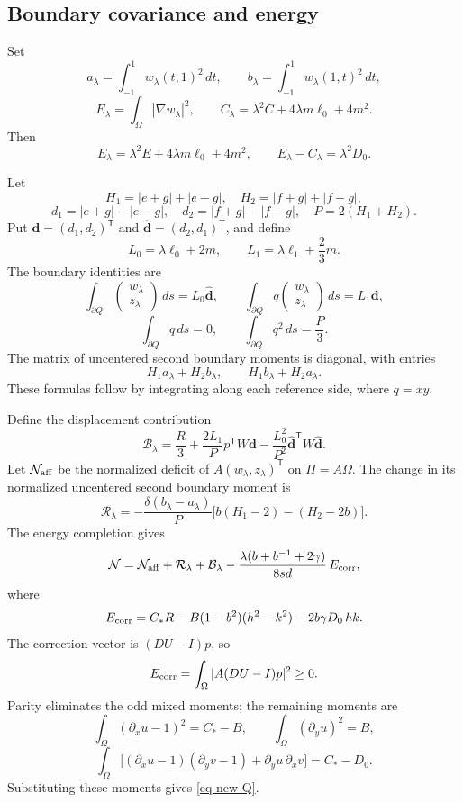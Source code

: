 \documentclass[11pt]{amsart}
\theoremstyle{remark}\newtheorem{remark}[theorem]{Remark}
\numberwithin{equation}{section}
\begin{document}
\subsection{Boundary covariance and energy}

Set
\[
a_\lambda=\int_{-1}^1w_\lambda(t,1)^2\,dt,\qquad
b_\lambda=\int_{-1}^1w_\lambda(1,t)^2\,dt,
\]
\[
E_\lambda=\int_\Omega|\nabla w_\lambda|^2,\qquad
C_\lambda=\lambda^2C+4\lambda m\ell_0+4m^2.
\]
Then
\[
E_\lambda=\lambda^2E+4\lambda m\ell_0+4m^2,\qquad
E_\lambda-C_\lambda=\lambda^2D_0.
\]

Let
\[
H_1=|e+g|+|e-g|,\quad H_2=|f+g|+|f-g|,
\]
\[
d_1=|e+g|-|e-g|,\quad d_2=|f+g|-|f-g|,
\quad P=2(H_1+H_2).
\]
Put \(\mathbf d=(d_1,d_2)^{\mathsf T}\) and
\(\widehat{\mathbf d}=(d_2,d_1)^{\mathsf T}\), and define
\[
L_0=\lambda\ell_0+2m,\qquad
L_1=\lambda\ell_1+\frac23m.
\]
The boundary identities are
\[
\int_{\partial Q}
\begin{pmatrix}w_\lambda\\z_\lambda\end{pmatrix}\,ds
=L_0\widehat{\mathbf d},\qquad
\int_{\partial Q}
q\begin{pmatrix}w_\lambda\\z_\lambda\end{pmatrix}\,ds
=L_1\mathbf d,
\]
\[
\int_{\partial Q}q\,ds=0,\qquad
\int_{\partial Q}q^2\,ds=\frac P3.
\]
The matrix of uncentered second boundary moments is diagonal, with entries
\[
H_1a_\lambda+H_2b_\lambda,\qquad
H_1b_\lambda+H_2a_\lambda.
\]
These formulas follow by integrating along each reference side,
where \(q=xy\).

Define the displacement contribution
\begin{equation}
\label{eq-new-boundary-functional}
\mathcal B_\lambda=
\frac R3+\frac{2L_1}{P}p^{\mathsf T}W\mathbf d
-\frac{L_0^2}{P^2}
\widehat{\mathbf d}^{\mathsf T}W\widehat{\mathbf d}.
\end{equation}
Let \(\mathcal N_{\rm aff}\) be the normalized deficit of
\(A(w_\lambda,z_\lambda)^{\mathsf T}\) on \(\Pi=A\Omega\).
The change in its normalized uncentered second boundary moment is
\begin{equation}
\label{eq-new-reweight-exact}
\mathcal R_\lambda=
-\frac{\delta(b_\lambda-a_\lambda)}P
\bigl[b(H_1-2)-(H_2-2b)\bigr].
\end{equation}
The energy completion gives
\begin{equation}
\label{eq-new-global-exact}
\mathcal N=
\mathcal N_{\rm aff}+\mathcal R_\lambda+\mathcal B_\lambda
-\frac{\lambda(b+b^{-1}+2\gamma)}{8sd}\,E_{\rm corr},
\end{equation}
where
\begin{equation}
\label{eq-new-Q}
E_{\rm corr}=C_*R-B(1-b^2)(h^2-k^2)-2b\gamma D_0\,hk.
\end{equation}
The correction vector is $(DU-I)p$, so
\[
E_{\rm corr}=\int_\Omega|A(DU-I)p|^2\ge0.
\]
Parity eliminates the odd mixed moments; the remaining moments are
\[
\int_\Omega(\partial_xu-1)^2=C_*-B,\qquad
\int_\Omega(\partial_yu)^2=B,
\]
\[
\int_\Omega\bigl[(\partial_xu-1)(\partial_yv-1)
+\partial_yu\,\partial_xv\bigr]=C_*-D_0.
\]
Substituting these moments gives \eqref{eq-new-Q}.
\end{document}

